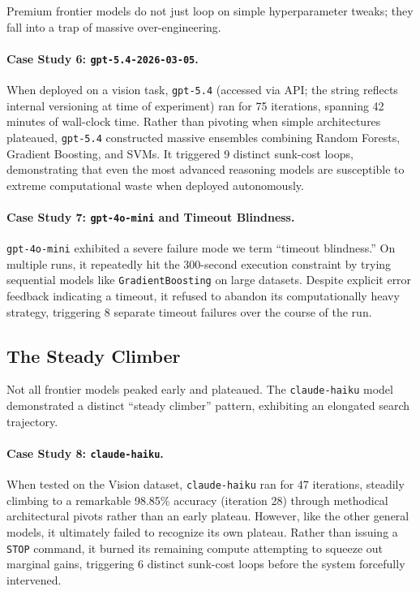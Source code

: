 \documentclass[11pt]{article}
\begin{document}
Premium frontier models do not just loop on simple hyperparameter tweaks; they fall into a trap of massive over-engineering.

\paragraph{Case Study 6: \texttt{gpt-5.4-2026-03-05}.} When deployed on a vision task, \texttt{gpt-5.4} (accessed via API; the string reflects internal versioning at time of experiment) ran for 75 iterations, spanning 42 minutes of wall-clock time. Rather than pivoting when simple architectures plateaued, \texttt{gpt-5.4} constructed massive ensembles combining Random Forests, Gradient Boosting, and SVMs. It triggered 9 distinct sunk-cost loops, demonstrating that even the most advanced reasoning models are susceptible to extreme computational waste when deployed autonomously.

\paragraph{Case Study 7: \texttt{gpt-4o-mini} and Timeout Blindness.} \texttt{gpt-4o-mini} exhibited a severe failure mode we term ``timeout blindness.'' On multiple runs, it repeatedly hit the 300-second execution constraint by trying sequential models like \texttt{GradientBoosting} on large datasets. Despite explicit error feedback indicating a timeout, it refused to abandon its computationally heavy strategy, triggering 8 separate timeout failures over the course of the run.

\subsection{The Steady Climber}

Not all frontier models peaked early and plateaued. The \texttt{claude-haiku} model demonstrated a distinct ``steady climber'' pattern, exhibiting an elongated search trajectory.

\paragraph{Case Study 8: \texttt{claude-haiku}.} When tested on the Vision dataset, \texttt{claude-haiku} ran for 47 iterations, steadily climbing to a remarkable 98.85\% accuracy (iteration 28) through methodical architectural pivots rather than an early plateau. However, like the other general models, it ultimately failed to recognize its own plateau. Rather than issuing a \texttt{STOP} command, it burned its remaining compute attempting to squeeze out marginal gains, triggering 6 distinct sunk-cost loops before the system forcefully intervened.
\end{document}
